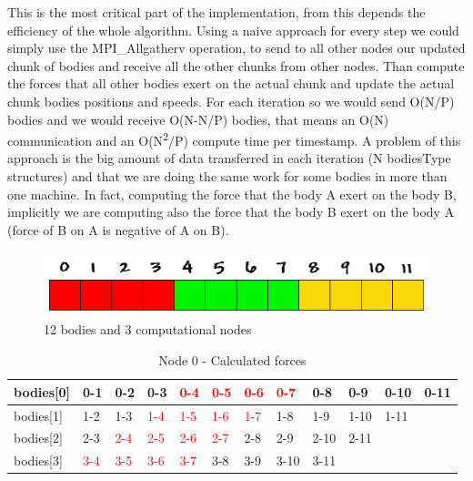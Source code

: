 \documentclass[a4paper]{article}
\begin{document}
This is the most critical part of the implementation, from this depends the efficiency of the whole algorithm. 
Using a naive approach for every step we could simply use the MPI\_Allgatherv operation, to send to all other nodes our updated chunk of bodies and receive all the other chunks from other nodes. Than compute the forces that all other bodies exert on the actual chunk and update the actual chunk bodies positions and speeds. For each iteration so we would send O(N/P) bodies and we would receive O(N-N/P) bodies, that means an O(N) communication and an O(N\textsuperscript{2}/P) compute time per timestamp. A problem of this approach is the big amount of data transferred in each iteration (N bodiesType structures) and that we are doing the same work for some bodies in more than one machine. In fact, computing the force that the body A exert on the body B, implicitly we are computing also the force that the body B exert on the body A (force of B on A is negative of A on B). 

\begin{figure}[ht]
  \centering\includegraphics[width=0.6\linewidth]{array_procs_3}
  \caption{12 bodies and 3 computational nodes}
  \label{fig:3nodes_}
\end{figure}
\FloatBarrier

\begin{table}[]
\centering
\caption{Node 0 - Calculated forces}
\label{table:t1}
\begin{tabular}{l|lllllllllll}
bodies{[}0{]} & 0-1 & 0-2 & 0-3 & \textcolor{red}{0-4} & \textcolor{red}{0-5} & \textcolor{red}{0-6} & \textcolor{red}{0-7}  & 0-8  & 0-9  & 0-10 & 0-11 \\ \hline
bodies{[}1{]} & 1-2 & 1-3 & \textcolor{red}{1-4} & \textcolor{red}{1-5} & \textcolor{red}{1-6} & \textcolor{red}{1-7} & 1-8  & 1-9  & 1-10 & 1-11 &      \\ \hline
bodies{[}2{]} & 2-3 & \textcolor{red}{2-4} & \textcolor{red}{2-5} & \textcolor{red}{2-6} & \textcolor{red}{2-7} & 2-8 & 2-9  & 2-10 & 2-11 &      &      \\ \hline
bodies{[}3{]} & \textcolor{red}{3-4} & \textcolor{red}{3-5} & \textcolor{red}{3-6} & \textcolor{red}{3-7} & 3-8 & 3-9 & 3-10 & 3-11 &      &      &   
\end{tabular}
\end{table}
\end{document}
